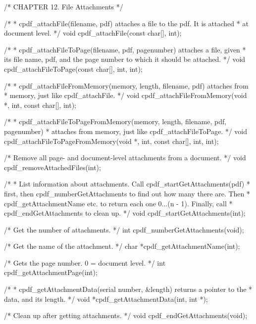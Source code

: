 /* CHAPTER 12. File Attachments */

/*
 * cpdf_attachFile(filename, pdf) attaches a file to the pdf. It is attached
 * at document level.
 */
void cpdf_attachFile(const char[], int);

/*
 * cpdf_attachFileToPage(filename, pdf, pagenumber) attaches a file, given
 * its file name, pdf, and the page number to which it should be attached.
 */
void cpdf_attachFileToPage(const char[], int, int);

/*
 * cpdf_attachFileFromMemory(memory, length, filename, pdf) attaches from
 * memory, just like cpdf_attachFile.
 */
void cpdf_attachFileFromMemory(void *, int, const char[], int);

/*
 * cpdf_attachFileToPageFromMemory(memory, length, filename, pdf, pagenumber)
 * attaches from memory, just like cpdf_attachFileToPage.
 */
void cpdf_attachFileToPageFromMemory(void *, int, const char[], int, int);

/* Remove all page- and document-level attachments from a document. */
void cpdf_removeAttachedFiles(int);

/*
 * List information about attachments. Call cpdf_startGetAttachments(pdf)
 * first, then cpdf_numberGetAttachments to find out how many there are. Then
 * cpdf_getAttachmentName etc. to return each one 0...(n - 1). Finally, call
 * cpdf_endGetAttachments to clean up.
 */
void cpdf_startGetAttachments(int);

/* Get the number of attachments. */
int cpdf_numberGetAttachments(void);

/* Get the name of the attachment. */
char *cpdf_getAttachmentName(int);

/* Gets the page number. 0 = document level. */
int cpdf_getAttachmentPage(int);

/*
 * cpdf_getAttachmentData(serial number, &length) returns a pointer to the
 * data, and its length.
 */
void *cpdf_getAttachmentData(int, int *);

/* Clean up after getting attachments. */
void cpdf_endGetAttachments(void);


